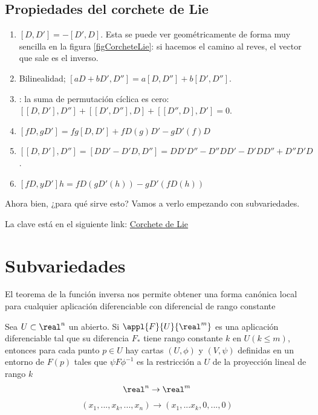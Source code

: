 \subsection{Propiedades del corchete de Lie}

\begin{enumerate}
\item $[D, D'] = - [D', D]$. Esta se puede ver geométricamente de forma muy sencilla en la figura \ref{figCorcheteLie}: si hacemos el camino al reves, el vector que sale es el inverso.
\item Bilinealidad; $[aD + bD', D''] = a[D, D''] + b[D', D'']$.
\item {}: la suma de permutación cíclica es cero: $[[D, D'], D''] + [[D',D''], D] + [[D'',D], D'] = 0$.
\item $[fD, gD'] = fg[D, D'] + fD(g)D' - gD'(f) D$
\item $[[D, D'], D''] = [DD' - D'D, D''] = DD'D'' -D''DD' - D'DD'' + D''D'D$.
\item $[fD, yD'] h = fD(gD'(h)) - gD'(fD(h))$
\end{enumerate}

Ahora bien, ¿para qué sirve esto? Vamos a verlo empezando con subvariedades.

La clave está en el siguiente link: \href{https://jadsuafu.wordpress.com/2012/09/27/calculos-tipicos-en-variedades-diferenciables-corchete-de-lie-derivada-de-lie-y-diferencial-exterior/}{Corchete de Lie}

\section{Subvariedades}

El teorema de la función inversa nos permite obtener una forma canónica local para cualquier aplicación diferenciable con diferencial de rango constante

\begin{theorem}
Sea $U \subset \real^n$ un abierto. Si $\appl{F}{U}{\real^m}$ es una aplicación diferenciable tal que su diferencia $F_*$ tiene rango constante $k$ en $U(k \leq m)$, entonces para cada punto $p\in U$ hay cartas $(U, \phi)$ y $(V, \psi)$ definidas en un entorno de $F(p)$ tales que $\psi F \phi^{-1}$ es la restricción a $U$ de la proyección lineal de rango $k$
\[\real^n \to \real^m\]
\[(x_1,...,x_k,...,x_n) \to (x_1,...x_k,0,...,0)\]
\end{theorem}

